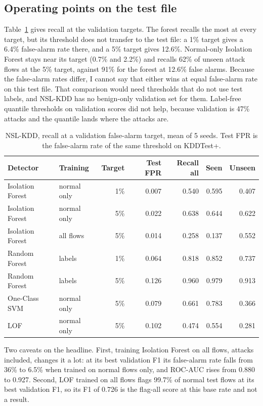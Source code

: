 \documentclass[10pt]{article}
\begin{document}
\subsection{Operating points on the test file}

Table~\ref{tab:fixed} gives recall at the validation targets. The forest recalls the most at every target, but
its threshold does not transfer to the test file: a 1\% target gives a 6.4\% false-alarm rate there, and a 5\%
target gives 12.6\%. Normal-only Isolation Forest stays near its target (0.7\% and 2.2\%) and recalls 62\% of
unseen attack flows at the 5\% target, against 91\% for the forest at 12.6\% false alarms. Because the
false-alarm rates differ, I cannot say that either wins at equal false-alarm rate on this test file. That
comparison would need thresholds that do not use test labels, and NSL-KDD has no benign-only validation set
for them. Label-free quantile thresholds on validation scores did not help, because validation is 47\% attacks
and the quantile lands where the attacks are.

\begin{table}[t]
\centering\small
\begin{tabular}{llrrrrr}
\toprule
Detector & Training & Target & Test FPR & Recall all & Seen & Unseen\\
\midrule
Isolation Forest & normal only & 1\% & 0.007 & 0.540 & 0.595 & 0.407\\
Isolation Forest & normal only & 5\% & 0.022 & 0.638 & 0.644 & 0.622\\
Isolation Forest & all flows & 5\% & 0.014 & 0.258 & 0.137 & 0.552\\
Random Forest & labels & 1\% & 0.064 & 0.818 & 0.852 & 0.737\\
Random Forest & labels & 5\% & 0.126 & 0.960 & 0.979 & 0.913\\
One-Class SVM & normal only & 5\% & 0.079 & 0.661 & 0.783 & 0.366\\
LOF & normal only & 5\% & 0.102 & 0.474 & 0.554 & 0.281\\
\bottomrule
\end{tabular}
\caption{NSL-KDD, recall at a validation false-alarm target, mean of 5 seeds. Test FPR is the false-alarm rate of
the same threshold on KDDTest+.}
\label{tab:fixed}
\end{table}

Two caveats on the headline. First, training Isolation Forest on all flows, attacks included, changes it a lot:
at its best validation F1 its false-alarm rate falls from 36\% to 6.5\% when trained on normal flows only,
and ROC-AUC rises from 0.880 to 0.927. Second, LOF trained on all flows flags 99.7\% of normal test flows at its
best validation F1, so its F1 of 0.726 is the flag-all score at this base rate and not a result.
\end{document}
